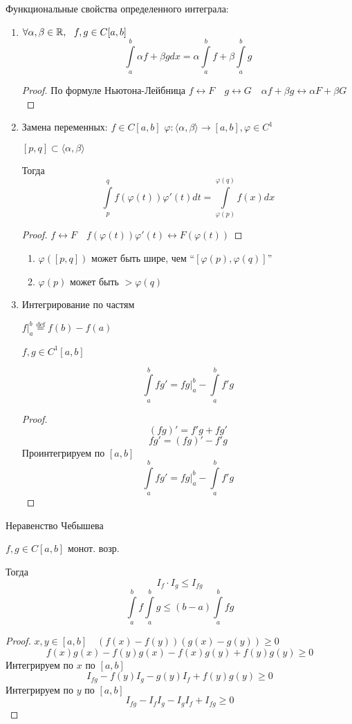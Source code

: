Функциональные свойства определенного интеграла:
\begin{enumerate}
    \item $\forall \alpha, \beta\in\mathbb{R},\ \ f,g\in C[a,b]$
    $$\int\limits_{a}^b \alpha f+\beta g dx = \alpha\int\limits_a^b f + \beta\int\limits_a^b g$$
    \begin{proof}
        По формуле Ньютона-Лейбница $f\leftrightarrow F \quad g\leftrightarrow G \quad \alpha f + \beta g \leftrightarrow \alpha F + \beta G$
    \end{proof}
    \item Замена переменных: $f\in C[a,b]$
    $\varphi : \langle \alpha,\beta\rangle \to [a,b], \varphi\in C^1$

    $[p, q]\subset \langle \alpha,\beta\rangle$

    Тогда $$\int\limits_p^q f(\varphi(t))\varphi'(t)dt=\int\limits_{\varphi(p)}^{\varphi(q)} f(x)dx$$
    \begin{proof}
        $f\leftrightarrow F \quad f(\varphi(t))\varphi'(t)\leftrightarrow F(\varphi(t))$
    \end{proof}
    \begin{remark}
        \begin{enumerate}
            \item $\varphi([p,q])$ может быть шире, чем ``$[\varphi(p), \varphi(q)]$''
            \item $\varphi(p)$ может быть $>\varphi(q)$
        \end{enumerate}
    \end{remark}

    \item Интегрирование по частям
    
    $f|_a^b\stackrel{\text{def}}{=}f(b)-f(a)$

    $f,g\in C^1[a,b]$

    $$\int\limits_a^b fg'=fg|_a^b-\int\limits_a^b f'g$$

    \begin{proof}
        $$(fg)'=f'g+fg'$$
        $$fg'=(fg)'-f'g$$
        Проинтегрируем по $[a,b]$
        $$\int\limits_a^b fg'=fg|_a^b-\int\limits_a^b f'g$$
    \end{proof}
\end{enumerate}

\begin{example}
    Неравенство Чебышева

    $f,g\in C[a,b]$ монот. возр.

    Тогда
    $$I_f\cdot I_g\leq I_{fg}$$
    $$\int\limits_a^b f \int\limits_a^b g\leq (b-a)\int\limits_a^b fg$$
\end{example}
\begin{proof}
    $x,y\in[a,b] \quad (f(x)-f(y))(g(x)-g(y))\geq 0$
    $$f(x)g(x)-f(y)g(x)-f(x)g(y)+f(y)g(y)\geq 0$$
    Интегрируем по $x$ по $[a,b]$
    $$I_{fg}-f(y)I_g-g(y)I_f+f(y)g(y)\geq 0$$
    Интегрируем по $y$ по $[a,b]$
    $$I_{fg}-I_fI_g-I_gI_f+I_{fg}\geq 0$$
\end{proof}

